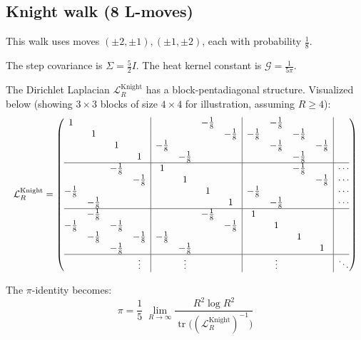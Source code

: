 \documentclass[reqno]{amsart}
\numberwithin{equation}{section}
\theoremstyle{definition}
\theoremstyle{remark}
\newcommand{\cG}{\mathcal{G}}
\DeclareMathOperator{\tr}{tr}
\begin{document}
\subsection{Knight walk (8 L-moves)}\label{app:knight}

This walk uses moves $(\pm2,\pm1),(\pm1,\pm2)$, each with probability $ \tfrac{1}{8} $.

The step covariance is $\Sigma = \tfrac{5}{2} I$. The heat kernel constant is $\cG = \frac{1}{5\pi}$.

The Dirichlet Laplacian $\mathcal{L}_R^{\text{Knight}}$ has a block-pentadiagonal structure. Visualized below (showing $3\times 3$ blocks of size $4\times 4$ for illustration, assuming $R\ge 4$):
\[
\resizebox{\linewidth}{!}{$
\mathcal{L}_R^{\text{Knight}} =
\left(\begin{array}{@{}cccc|cccc|cccc|c@{}}
1 & & & & & & -\frac{1}{8} & & & -\frac{1}{8} & & & \\
& 1 & & & & & & -\frac{1}{8} & -\frac{1}{8} & & -\frac{1}{8} & & \\
& & 1 & & -\frac{1}{8} & & & & & -\frac{1}{8} & & -\frac{1}{8} & \\
& & & 1 & & -\frac{1}{8} & & & & & -\frac{1}{8} & & \\
\hline
& & -\frac{1}{8} & & 1 & & & & & & -\frac{1}{8} & & \cdots \\
& & & -\frac{1}{8} & & 1 & & & & & & -\frac{1}{8} & \cdots \\
-\frac{1}{8} & & & & & & 1 & & -\frac{1}{8} & & & & \cdots \\
& -\frac{1}{8} & & & & & & 1 & & -\frac{1}{8} & & & \cdots \\
\hline
& -\frac{1}{8} & & & & & -\frac{1}{8} & & 1 & & & & \\
-\frac{1}{8} & & -\frac{1}{8} & & & & & -\frac{1}{8} & & 1 & & & \\
& -\frac{1}{8} & & -\frac{1}{8} & -\frac{1}{8} & & & & & & 1 & & \\
& & -\frac{1}{8} & & & -\frac{1}{8} & & & & & & 1 & \\
\hline
& & & \vdots & & \vdots & & & & \vdots & & & \ddots
\end{array}\right)
$}
\]

The $\pi$-identity becomes:
\begin{equation}\label{eq:Knight_pi}
\boxed{\;\displaystyle \pi=\frac{1}{5}\;\lim_{R\to\infty}\frac{R^{2}\log R^{2}}{\tr\!\bigl((\mathcal{L}_R^{\text{Knight}})^{-1}\bigr)}\;}
\end{equation}
\end{document}
